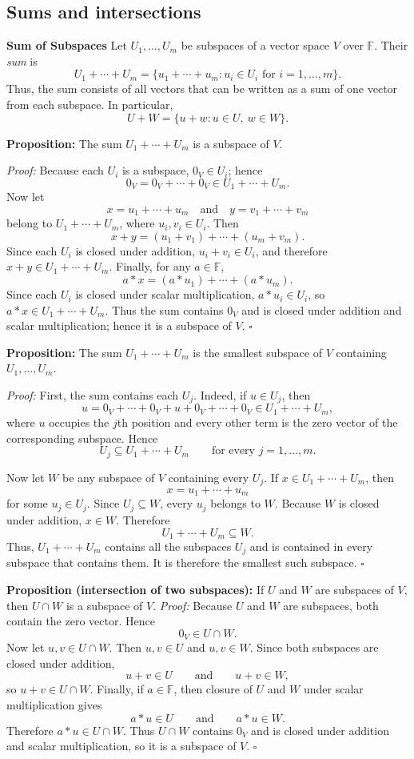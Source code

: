 \documentclass[a4paper,11pt,abstract=true]{scrartcl}
\theoremstyle{dotlessP}
\theoremstyle{dotlessS}
\theoremstyle{remark}
\theoremstyle{definition}
\begin{document}
\subsection{Sums and intersections}
\begin{definition_box}
\textbf{Sum of Subspaces} Let $U_1,\ldots,U_m$ be subspaces of
a vector space $V$ over $\mathbb{F}$. Their \emph{sum} is
\[
U_1+\cdots+U_m
=\{u_1+\cdots+u_m:u_i\in U_i\text{ for }i=1,\ldots,m\}.
\]
Thus, the sum consists of all vectors that can be written as a sum of one
vector from each subspace. In particular,
\[
U+W=\{u+w:u\in U,\ w\in W\}.
\]
\end{definition_box}

\textbf{Proposition:} The sum $U_1+\cdots+U_m$ is a subspace of $V$.

\textit{Proof:} Because each $U_i$ is a subspace, $0_V\in U_i$; hence
\[
0_V=0_V+\cdots+0_V\in U_1+\cdots+U_m.
\]
Now let
\[
x=u_1+\cdots+u_m
\quad\text{and}\quad
y=v_1+\cdots+v_m
\]
belong to $U_1+\cdots+U_m$, where $u_i,v_i\in U_i$. Then
\[
x+y=(u_1+v_1)+\cdots+(u_m+v_m).
\]
Since each $U_i$ is closed under addition, $u_i+v_i\in U_i$, and therefore
$x+y\in U_1+\cdots+U_m$. Finally, for any $a\in \mathbb{F}$,
\[
a*x=(a*u_1)+\cdots+(a*u_m).
\]
Since each $U_i$ is closed under scalar multiplication, $a*u_i\in U_i$, so
$a*x\in U_1+\cdots+U_m$. Thus the sum contains $0_V$ and is closed under
addition and scalar multiplication; hence it is a subspace of $V$.
\hfill$\square$

\textbf{Proposition:} The sum $U_1+\cdots+U_m$ is the smallest subspace of
$V$ containing $U_1,\ldots,U_m$.

\textit{Proof:} First, the sum contains each $U_j$. Indeed, if $u\in U_j$,
then
\[
u=0_V+\cdots+0_V+u+0_V+\cdots+0_V\in U_1+\cdots+U_m,
\]
where $u$ occupies the $j$th position and every other term is the zero vector
of the corresponding subspace. Hence
\[
U_j\subseteq U_1+\cdots+U_m
\qquad\text{for every }j=1,\ldots,m.
\]

Now let $W$ be any subspace of $V$ containing every $U_j$. If
$x\in U_1+\cdots+U_m$, then
\[
x=u_1+\cdots+u_m
\]
for some $u_j\in U_j$. Since $U_j\subseteq W$, every $u_j$ belongs to $W$.
Because $W$ is closed under addition, $x\in W$. Therefore
\[
U_1+\cdots+U_m\subseteq W.
\]
Thus, $U_1+\cdots+U_m$ contains all the subspaces $U_j$ and is contained in
every subspace that contains them. It is therefore the smallest such subspace.
\hfill$\square$

\textbf{Proposition (intersection of two subspaces):} If $U$ and $W$ are
subspaces of $V$, then $U\cap W$ is a subspace of $V$.
\textit{Proof:} Because $U$ and $W$ are subspaces, both contain the zero
vector. Hence
\[
0_V\in U\cap W.
\]
Now let $u,v\in U\cap W$. Then $u,v\in U$ and $u,v\in W$. Since both
subspaces are closed under addition,
\[
u+v\in U
\qquad\text{and}\qquad
u+v\in W,
\]
so $u+v\in U\cap W$. Finally, if $a\in \mathbb{F}$, then closure of $U$ and $W$ under
scalar multiplication gives
\[
a*u\in U
\qquad\text{and}\qquad
a*u\in W.
\]
Therefore $a*u\in U\cap W$. Thus $U\cap W$ contains $0_V$ and is closed
under addition and scalar multiplication, so it is a subspace of $V$.
\hfill$\square$
\end{document}
